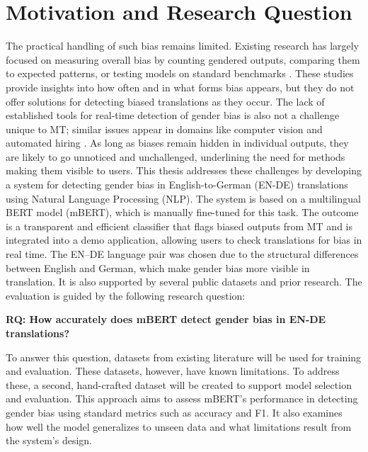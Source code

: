 \section{Motivation and Research Question}
    The practical handling of such bias remains limited. Existing research has largely focused on measuring overall bias by counting gendered outputs, comparing them to expected patterns, or testing models on standard benchmarks \parencite{rescignoGenderBiasMachine2023,barclayInvestigatingMarkersDrivers2024a,pratesAssessingGenderBias2019,savoldiWhatHarmQuantifying2024}. These studies provide insights into how often and in what forms bias appears, but they do not offer solutions for detecting biased translations as they occur. The lack of established tools for real-time detection of gender bias is also not a challenge unique to MT; similar issues appear in domains like computer vision and automated hiring \parencite{schwemmerDiagnosingGenderBias2020}. As long as biases remain hidden in individual outputs, they are likely to go unnoticed and unchallenged, underlining the need for methods making them visible to users. This thesis addresses these challenges by developing a system for detecting gender bias in English-to-German (EN-DE) translations using Natural Language Processing (NLP). The system is based on a multilingual BERT model (mBERT), which is manually fine-tuned for this task. The outcome is a transparent and efficient classifier that flags biased outputs from MT and is integrated into a demo application, allowing users to check translations for bias in real time. The EN–DE language pair was chosen due to the structural differences between English and German, which make gender bias more visible in translation. It is also supported by several public datasets and prior research. The evaluation is guided by the following research question:

    \vspace{0.8em}
    \noindent \textbf{RQ: How accurately does mBERT detect gender bias in EN-DE translations?}

    \vspace{0.8em}

    \noindent To answer this question, datasets from existing literature will be used for training and evaluation. These datasets, however, have known limitations. To address these, a second, hand-crafted dataset will be created to support model selection and evaluation. This approach aims to assess mBERT’s performance in detecting gender bias using standard metrics such as accuracy and F1. It also examines how well the model generalizes to unseen data and what limitations result from the system’s design.

